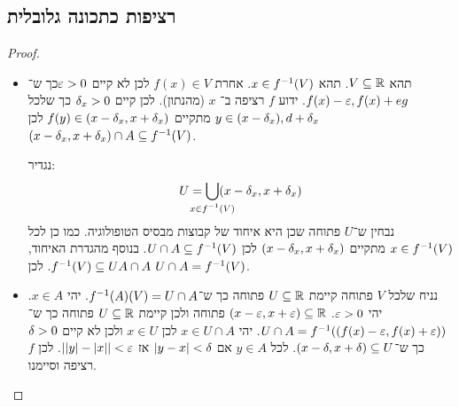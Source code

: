\documentclass[name=רשימות חשבון דיפרנציאלי ואינטגרלי 1א]{../../../tex/classes/megasumPreamble}
\begin{document}
	\subsection{רציפות כתכונה גלובלית}
	\begin{proof}
		\begin{itemize}
			\item[$\implies$]תהא $V \subseteq \mathbb{R}$. תהא $x \in f^{-1}(V)$. אחרת $f(x) \in V$ לכן לא קיים $\eg > 0$כך ש־$f(x)- \eg, f(x) + eg$. ידוע $f$ רציפה ב־ $x$ (מהנתון). לכן קיים $\delta_x > 0$ כך שלכל $y \in (x - \delta_x), d + \delta_x$ מתקיים $f(y) \in (x - \delta_x, x + \delta_x)$ לכן $(x - \delta_x, x + \delta_x) \cap A \subseteq f^{-1}(V)$.

			נגדיר:
			\[ U = \bigcup_{\mathclap{x \in f\op(V)}}(x - \dg_x, x + \dg_x) \]
			נבחין ש־$U$ פתוחה שכן היא איחוד של קבוצות מבסיס הטופולוגיה. כמו כן לכל $x \in f^{-1}(V)$ מתקיים $(x - \delta_x, x + \delta_x)$ לכן $U \cap A \subseteq f^{-1}(V)$. בנוסף מהגדרת האיחוד, $f^{-1}(V) \subseteq UA \cap A$. לכן $U \cap A = f^{-1}(V)$.
			\item[$\impliedby$]נניח שלכל $V$ פתוחה קיימת $U \subseteq \mathbb{R}$ פתוחה כך ש־$f^{-1}(A)(V) = U \cap A$. יהי $x \in A$. יהי $\eg > 0$. $(x - \eg, x + \eg) \subseteq \R$ פתוחה ולכן קיימת $U \subseteq \mathbb{R}$ פתוחה כך ש־$U \cap A = f\op((f(x) - \eg, f(x) + \eg))$. יהי $x \in U \cap A$ לכן $x \in U$ ולכן לא קיים $\delta > 0$ כך ש־$(x - \delta, x + \delta) \subseteq U$. לכל $y \in A$ אם $\left \lvert y - x \right \rvert < \delta$ אז $\sof{\sof{y} - \sof{x}} < \eg$. לכן $f$ רציפה וסיימנו.
		\end{itemize}
	\end{proof}
\end{document}
